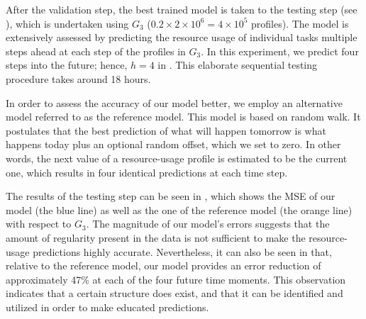 After the validation step, the best trained model is taken to the testing step
(see ), which is undertaken using $G_3$ ($0.2 \times 2
\times 10^6 = 4 \times 10^5$ profiles). The model is extensively assessed by
predicting the resource usage of individual tasks multiple steps ahead at each
step of the profiles in $G_3$. In this experiment, we predict four steps into
the future; hence, $h = 4$ in . This elaborate sequential
testing procedure takes around 18 hours.

In order to assess the accuracy of our model better, we employ an alternative
model referred to as the reference model. This model is based on random walk. It
postulates that the best prediction of what will happen tomorrow is what happens
today plus an optional random offset, which we set to zero. In other words, the
next value of a resource-usage profile is estimated to be the current one, which
results in four identical predictions at each time step.

The results of the testing step can be seen in , which shows
the \ac{MSE} of our model (the blue line) as well as the one of the reference
model (the orange line) with respect to $G_3$. The magnitude of our model's
errors suggests that the amount of regularity present in the data is not
sufficient to make the resource-usage predictions highly accurate. Nevertheless,
it can also be seen in  that, relative to the reference
model, our model provides an error reduction of approximately 47\% at each of
the four future time moments. This observation indicates that a certain
structure does exist, and that it can be identified and utilized in order to
make educated predictions.
